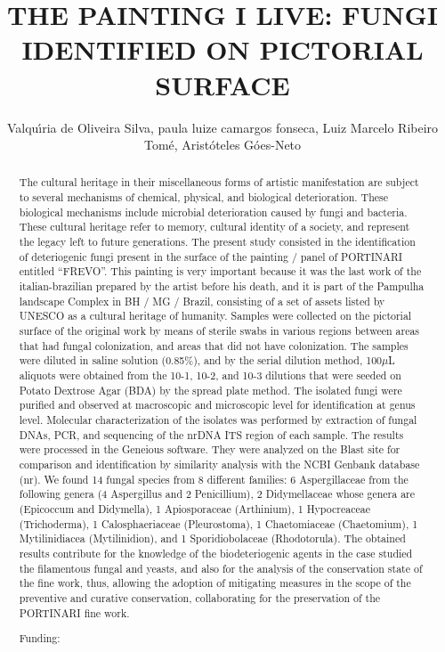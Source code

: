 \documentclass[twoside]{article}
\title{\vspace{-15mm}\fontsize{24pt}{10pt}\selectfont\textbf{ THE PAINTING I LIVE: FUNGI IDENTIFIED ON PICTORIAL SURFACE }} %
\author{ Valqu\'{\i}ria de Oliveira Silva, paula  luize camargos fonseca, Luiz Marcelo Ribeiro Tom\'e, Arist\'oteles G\'oes-Neto }
\affil{ UFMG }
\date{}
\begin{document}
  
  
  \maketitle %
  
  
  \thispagestyle{fancy} %
  
  
  \begin{abstract}
  The cultural heritage in their miscellaneous  forms of artistic manifestation are subject to several mechanisms of chemical,  physical,  and biological deterioration. These biological mechanisms include microbial deterioration caused by fungi and bacteria. These cultural heritage refer to memory,  cultural identity of a society,  and represent the legacy left to future generations. The present study consisted in the identification of deteriogenic fungi present in the surface of the painting / panel of PORTINARI entitled “FREVO”. This painting is very important because it was the last work of the italian-brazilian prepared by the artist before his death,  and it is part of the Pampulha landscape Complex in BH / MG / Brazil,  consisting of a set of assets listed by UNESCO as a cultural heritage of humanity.
Samples were collected on the pictorial surface of the original work by means of sterile swabs in various regions between areas that had fungal colonization,  and areas that did not have colonization. The samples were diluted in saline solution (0.85\%),  and by the serial dilution method,  100$\mu$L aliquots were obtained from the 10-1,  10-2,  and 10-3 dilutions that were seeded on Potato Dextrose Agar (BDA) by the spread plate method. The isolated fungi were purified and observed at macroscopic and microscopic level for identification at genus level. Molecular characterization of the isolates was performed by extraction of fungal DNAs,  PCR,  and sequencing of the nrDNA ITS region of each sample. The results were processed in the Geneious software. They were analyzed on the Blast site for comparison and identification by similarity analysis with the NCBI Genbank database (nr). We found 14 fungal species from 8 different families: 6 Aspergillaceae from the following genera (4 Aspergillus and 2 Penicillium),  2 Didymellaceae whose genera are (Epicoccum and Didymella),  1 Apiosporaceae (Arthinium),  1 Hypocreaceae (Trichoderma),  1 Calosphaeriaceae (Pleurostoma),  1 Chaetomiaceae (Chaetomium),  1 Mytilinidiacea (Mytilinidion),  and 1 Sporidiobolaceae (Rhodotorula). The obtained results contribute for the knowledge of the biodeteriogenic agents in the case studied the filamentous fungal and yeasts,  and also for the analysis of the conservation state of the fine work,  thus,  allowing the adoption of mitigating measures in the scope of the preventive and curative conservation,  collaborating for the preservation of the PORTINARI fine work.
  
  Funding:  \\ 
  \end{abstract}
  
\end{document}
